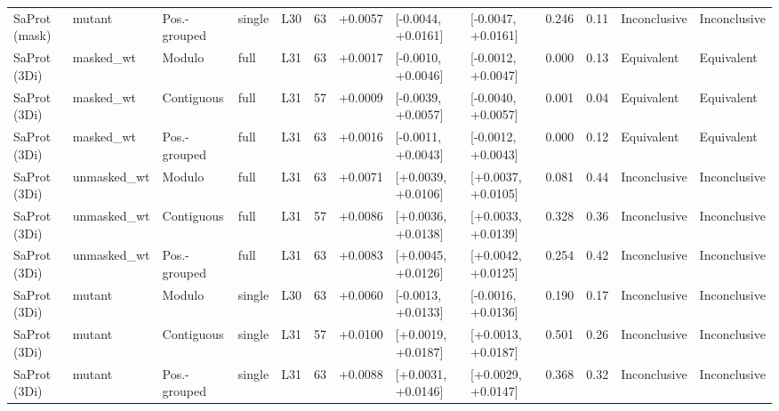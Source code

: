 \documentclass[11pt,a4paper]{article}
\begin{document}
\begin{landscape}
\begin{table}[p]
\begin{tabular}{llllrrrllrrll}
SaProt (mask) & mutant & Pos.-grouped & single & L30 & 63 & +0.0057 & [-0.0044, +0.0161] & [-0.0047, +0.0161] & 0.246 & 0.11 & Inconclusive & Inconclusive \\
SaProt (3Di) & masked\_wt & Modulo & full & L31 & 63 & +0.0017 & [-0.0010, +0.0046] & [-0.0012, +0.0047] & 0.000 & 0.13 & Equivalent & Equivalent \\
SaProt (3Di) & masked\_wt & Contiguous & full & L31 & 57 & +0.0009 & [-0.0039, +0.0057] & [-0.0040, +0.0057] & 0.001 & 0.04 & Equivalent & Equivalent \\
SaProt (3Di) & masked\_wt & Pos.-grouped & full & L31 & 63 & +0.0016 & [-0.0011, +0.0043] & [-0.0012, +0.0043] & 0.000 & 0.12 & Equivalent & Equivalent \\
SaProt (3Di) & unmasked\_wt & Modulo & full & L31 & 63 & +0.0071 & [+0.0039, +0.0106] & [+0.0037, +0.0105] & 0.081 & 0.44 & Inconclusive & Inconclusive \\
SaProt (3Di) & unmasked\_wt & Contiguous & full & L31 & 57 & +0.0086 & [+0.0036, +0.0138] & [+0.0033, +0.0139] & 0.328 & 0.36 & Inconclusive & Inconclusive \\
SaProt (3Di) & unmasked\_wt & Pos.-grouped & full & L31 & 63 & +0.0083 & [+0.0045, +0.0126] & [+0.0042, +0.0125] & 0.254 & 0.42 & Inconclusive & Inconclusive \\
SaProt (3Di) & mutant & Modulo & single & L30 & 63 & +0.0060 & [-0.0013, +0.0133] & [-0.0016, +0.0136] & 0.190 & 0.17 & Inconclusive & Inconclusive \\
SaProt (3Di) & mutant & Contiguous & single & L31 & 57 & +0.0100 & [+0.0019, +0.0187] & [+0.0013, +0.0187] & 0.501 & 0.26 & Inconclusive & Inconclusive \\
SaProt (3Di) & mutant & Pos.-grouped & single & L31 & 63 & +0.0088 & [+0.0031, +0.0146] & [+0.0029, +0.0147] & 0.368 & 0.32 & Inconclusive & Inconclusive \\
\bottomrule
\end{tabular}\end{table}\end{landscape}
\end{document}
